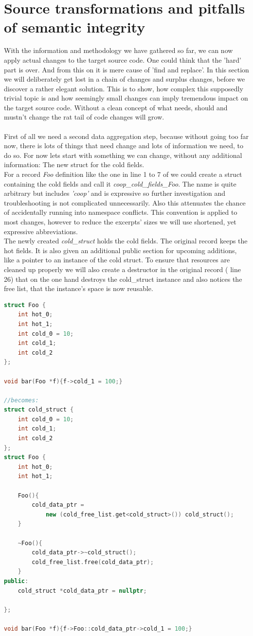 \chapter{Source transformations and pitfalls of semantic integrity}
With the information and methodology we have gathered so far, we can now apply actual changes to the target source code. One could think that the 'hard' part is over. And from this on it is mere cause of 'find and replace'. In this section we will deliberately get lost in a chain of changes and surplus changes, before we discover a rather elegant solution. This is to show, how complex this supposedly trivial topic is and how seemingly small changes can imply tremendous impact on the target source code. Without a clean concept of what needs, should and mustn't change the rat tail of code changes will grow.\\\\
First of all we need a second data aggregation step, because without going too far now, there is lots of things that need change and lots of information we need, to do so. For now lets start with something we can change, without any additional information: The new struct for the cold fields.\\
For a record \textit{Foo} definition like the one in line 1 to 7 of  we could create a struct containing the cold fields and call it \textit{coop\_cold\_fields\_Foo}. The name is quite arbitrary but includes \textit{'coop'} and is expressive so further investigation and troubleshooting is not complicated unnecessarily. Also this attenuates the chance of accidentally running into namespace conflicts. This convention is applied to most changes, however to reduce the excerpts' sizes we will use shortened, yet expressive abbreviations.\\
The newly created \textit{cold\_struct} holds the cold fields. The original record keeps the hot fields. It is also given an additional public section for upcoming additions, like a pointer to an instance of the cold struct. To ensure that resources are cleaned up properly we will also create a destructor in the original record ( line 26) that on the one hand destroys the cold\_struct instance and also notices the free list, that the instance's space is now reusable.
\begin{lstlisting}[language=C++,name={Example of how a record might be split. However this split implies problematic aftereffects.},label={example_split_0}]
struct Foo {
	int hot_0;
	int hot_1;
	int cold_0 = 10;
	int cold_1;
	int cold_2
};

void bar(Foo *f){f->cold_1 = 100;}

//becomes:
struct cold_struct {
	int cold_0 = 10;
	int cold_1;
	int cold_2
};
struct Foo {
	int hot_0;
	int hot_1;
	
	Foo(){
		cold_data_ptr = 
			new (cold_free_list.get<cold_struct>()) cold_struct();
	}
	
	~Foo(){
		cold_data_ptr->~cold_struct();
		cold_free_list.free(cold_data_ptr);
	}
public:
	cold_struct *cold_data_ptr = nullptr;

};

void bar(Foo *f){f->Foo::cold_data_ptr->cold_1 = 100;}
\end{lstlisting}
